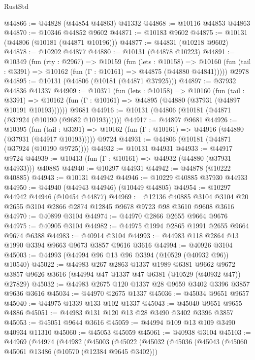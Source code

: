 \begin{lexlean}{RustStd}
\begin{coremodule}
@44866 := @44828 (@44854 @44863) @41332
@44868 := @10116 @44853 @44863
@44870 := @10346 @44852 @9602
@44871 := @10183 @9602
@44875 := @10131 (@44806 (@10181 (@44871 @10196)))
@44877 := @44831 (@10218 @9602)
@44878 := @10202 @44877
@44880 := @10131 (@44878 @10223)
@44891 := @10349
    (fun (rty : @2967) =>
    @10159
      (fun (lets : @10158) =>
      @10160 (fun (tail : @3391) => @10162 (fun (Γ : @10161) => @44875 (@44880 @44841)))))
    @2978
@44895 := @10131 (@44806 (@10181 (@44871 @37925)))
@44897 := @37932 @44836 @41337
@44909 := @10371
    (fun (lets : @10158) =>
    @10160
      (fun (tail : @3391) =>
      @10162 (fun (Γ : @10161) => @44895 (@44880 (@37931 (@44897 @10191 @10193))))))
    @9681
@44916 := @10131 (@44806 (@10181 (@44871 (@37924 (@10190 (@9682 @10193))))))
@44917 := @44897 @9681
@44926 := @10395
    (fun (tail : @3391) => @10162 (fun (Γ : @10161) => @44916 (@44880 (@37931 (@44917 @10193)))))
    @9724
@44931 := @44806 (@10181 (@44871 (@37924 (@10190 @9725))))
@44932 := @10131 @44931
@44933 := @44917 @9724
@44939 := @10413 (fun (Γ : @10161) => @44932 (@44880 (@37931 @44933))) @40885
@44940 := @10297 @44931
@44942 := @44878 (@10222 @40885)
@44943 := @10131 @44942
@44946 := @10229 @40885 @37930 @44933
@44950 := @44940 (@44943 @44946) (@10449 @44805)
@44954 := @10297 @44942 @44946 (@10454 @44877)
@44969 := @12136
    @40885
    @3104
    @3104
    @20
    @2655
    @3104
    @2866
    @2874
    @12845
    @9678
    @9723
    @98
    @3610
    @9608
    @3616
@44970 := @40899 @3104
@44974 := @44970 @2866 @2655 @9664 @9676
@44975 := @40905 @3104
@44982 := @44975 @1994 @2865 @1991 @2655 @9664 @9674 @6388
@44983 := @40914 @3104
@44993 := @44983 @118 @2864 @13 @1990 @3394 @9663 @9673 @3857 @9616 @3616
@44994 := @40926 @3104
@45003 := @44993 (@44994 @96 @13 @96 @3394 (@10529 (@40932 @96)) @10540)
@45022 := @44983
    @267
    @2863
    @1337
    @1989
    @6381
    @9662
    @9672
    @3857
    @9626
    @3616
    (@44994 @47 @1337 @47 @6381 (@10529 (@40932 @47)) @27829)
@45032 := @44983 @2675 @120 @1337 @28 @9659 @3402 @3396 @3857 @9636 @3616
@45034 := @44970 @2675 @1337
@45036 := @45034 @9651 @9657
@45040 := @44975 @1339 @133 @102 @1337
@45043 := @45040 @9651 @9655 @4886
@45051 := @44983 @131 @120 @13 @28 @3490 @3402 @3396 @3857
@45053 := @45051 @9644 @3616
@45059 := @44994 @109 @13 @109 @3490 @40934 @11310
@45060 := @45053 @45059
@45061 := @40938 @3104
@45103 := @44969
    (@44974
      (@44982
        (@45003
          (@45022
            (@45032
              (@45036
                (@45043
                  (@45060 @45061 @13486 (@10570 (@12384 @9645 @3402)))

\end{coremodule}
\end{lexlean}
